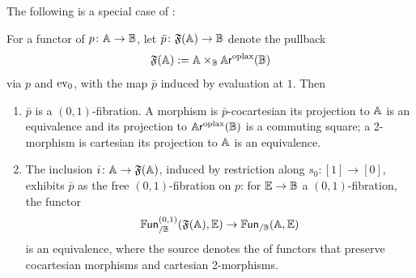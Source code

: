 \documentclass[a4paper,11pt]{article}
\newcommand{\FFr}{\mathfrak{F}}
\begin{document}
The following is a special case of \cite[Theorem 4.2.1]{decorated}:
\begin{thm}
  For a functor of \itcats{} $p \colon \tA \to \tB$, let $\bar{p}
  \colon \FFr(\tA)
  \to \tB$ denote the pullback
  \[ \FFr(\tA) := \tA \times_{\tB} \ARopl(\tB)\]
  via $p$ and $\text{\textup{ev}}_{0}$, with the map $\bar{p}$ induced by evaluation
  at $1$. Then
  \begin{enumerate}[(1)]
  \item $\bar{p}$ is a $(0,1)$-fibration. A morphism is
    $\bar{p}$-cocartesian \IFF{} its projection to $\mathbb{A}$ is an
    equivalence and its projection to $\mathbb{A}\mkern-0.5mu\textsf{\textup{r}}^{\text{\textup{oplax}}}(\mathbb{B})$ is a commuting
    square; a 2-morphism is cartesian \IFF{} its projection to $\mathbb{A}$
    is an equivalence.
  \item The inclusion $i \colon \tA \to \FFr(\tA)$, induced by
  restriction along $s_{0} \colon [1] \to [0]$, exhibits $\bar{p}$ as
  the free $(0,1)$-fibration on $p$: for $\tE \to \tB$ a
  $(0,1)$-fibration, the functor
  \[ \FUN^{(0,1)}_{/\tB}(\FFr(\tA), \tE) \to \FUN_{/\tB}(\tA, \tE)\]
  is an equivalence, where the source denotes the \itcat{} of functors
  that preserve cocartesian morphisms and cartesian 2-morphisms.
  \end{enumerate}
\end{thm}
\end{document}
